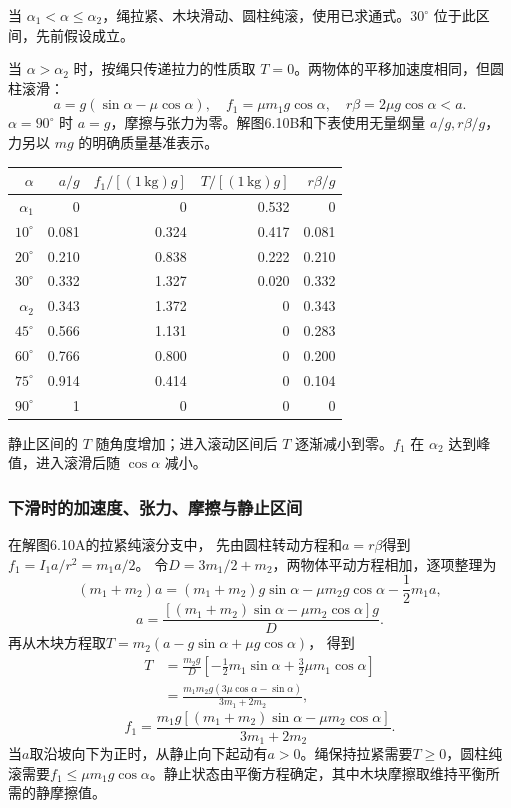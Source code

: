 \documentclass[UTF8,fontset=fandol,a4paper,11pt]{ctexart}
\begin{document}
当 $\alpha_1<\alpha\le\alpha_2$，绳拉紧、木块滑动、圆柱纯滚，使用已求通式。$30^\circ$ 位于此区间，先前假设成立。

当 $\alpha>\alpha_2$ 时，按绳只传递拉力的性质取 $T=0$。两物体的平移加速度相同，但圆柱滚滑：
\[
 a=g(\sin\alpha-\mu\cos\alpha),\quad
 f_1=\mu m_1g\cos\alpha,\quad
 r\beta=2\mu g\cos\alpha<a.
\]
$\alpha=90^\circ$ 时 $a=g$，摩擦与张力为零。解图6.10B和下表使用无量纲量 $a/g,r\beta/g$，力另以 $mg$ 的明确质量基准表示。
\begin{center}\small
\begin{tabular}{r|rrrr}
\toprule $\alpha$ & $a/g$ & $f_1/[(1\,\mathrm{kg})g]$ & $T/[(1\,\mathrm{kg})g]$ & $r\beta/g$\\\midrule
$\alpha_1$ &0&0&0.532&0\\
$10^\circ$ &0.081&0.324&0.417&0.081\\
$20^\circ$ &0.210&0.838&0.222&0.210\\
$30^\circ$ &0.332&1.327&0.020&0.332\\
$\alpha_2$ &0.343&1.372&0&0.343\\
$45^\circ$ &0.566&1.131&0&0.283\\
$60^\circ$ &0.766&0.800&0&0.200\\
$75^\circ$ &0.914&0.414&0&0.104\\
$90^\circ$ &1&0&0&0\\\bottomrule
\end{tabular}\end{center}
静止区间的 $T$ 随角度增加；进入滚动区间后 $T$ 逐渐减小到零。$f_1$ 在 $\alpha_2$ 达到峰值，进入滚滑后随 $\cos\alpha$ 减小。
\subsubsection*{下滑时的加速度、张力、摩擦与静止区间}
在解图6.10A的拉紧纯滚分支中，
先由圆柱转动方程和$a=r\beta$得到
$f_1=I_1a/r^2=m_1a/2$。
令$D=3m_1/2+m_2$，两物体平动方程相加，逐项整理为
\[
(m_1+m_2)a=(m_1+m_2)g\sin\alpha
-\mu m_2g\cos\alpha-\frac12m_1a,
\]
\[
a=\frac{[(m_1+m_2)\sin\alpha-\mu m_2\cos\alpha]g}{D}.
\]
再从木块方程取$T=m_2(a-g\sin\alpha+\mu g\cos\alpha)$，
得到
\[
\begin{aligned}
T&=\frac{m_2g}{D}\left[-\frac12m_1\sin\alpha
+\frac32\mu m_1\cos\alpha\right]\\
&=\frac{m_1m_2g(3\mu\cos\alpha-\sin\alpha)}{3m_1+2m_2},
\end{aligned}
\]
\[
f_1=\frac{m_1g[(m_1+m_2)\sin\alpha-\mu m_2\cos\alpha]}{3m_1+2m_2}.
\]
当$a$取沿坡向下为正时，从静止向下起动有$a>0$。绳保持拉紧需要$T\geq0$，圆柱纯滚需要$f_1\leq\mu m_1g\cos\alpha$。静止状态由平衡方程确定，其中木块摩擦取维持平衡所需的静摩擦值。
\end{document}
